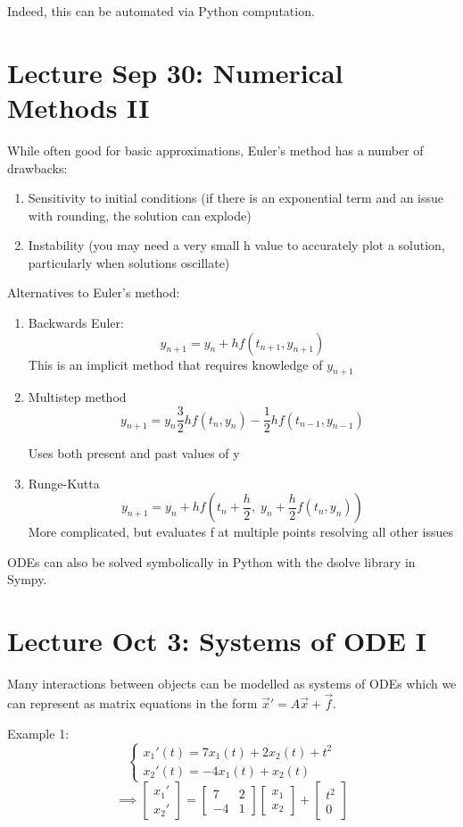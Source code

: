\documentclass[12pt]{article}
\begin{document}
Indeed, this can be automated via Python computation. 

\section{Lecture Sep 30: Numerical Methods II}
While often good for basic approximations, Euler's method has a number of drawbacks:
\begin{enumerate}
    \item Sensitivity to initial conditions (if there is an exponential term and an issue with rounding, the solution can explode)
    \item Instability (you may need a very small h value to accurately plot a solution, particularly when solutions oscillate)
\end{enumerate}

Alternatives to Euler's method: 
\begin{enumerate}
    \item Backwards Euler:
    \[y_{n+1} = y_n + hf(t_{n + 1}, y_{n + 1})\]
    This is an implicit method that requires knowledge of $y_{n + 1}$

    \item Multistep method 
    \[y_{n+1} = y_n \frac{3}{2}hf(t_n, y_n) - \frac{1}{2}hf(t_{n - 1}, y_{n -1})\] 

    Uses both present and past values of y

    \item Runge-Kutta 
    \[y_{n+ 1} = y_n + hf(t_n + \frac{h}{2}, \; y_n + \frac{h}{2} f(t_n, y_n))\]
    More complicated, but evaluates f at multiple points resolving all other issues
\end{enumerate}

ODEs can also be solved symbolically in Python with the dsolve library in Sympy.

\section{Lecture Oct 3: Systems of ODE I}
Many interactions between objects can be modelled as systems of ODEs which we can represent as matrix equations in the form $\vec{x}' = A\vec{x} + \vec{f}$.

Example 1: 
\[\begin{cases}
    x_1'(t) = 7x_1(t) + 2x_2(t) + t^2\\
    x_2'(t) = -4x_1(t) + x_2(t)
\end{cases}\]
\[\implies \begin{bmatrix}
    x_1'\\
    x_2'
\end{bmatrix} = \begin{bmatrix}
    7 & 2\\
    -4 & 1
\end{bmatrix} \begin{bmatrix}
    x_1\\
    x_2
\end{bmatrix} + \begin{bmatrix}
    t^2\\
    0
\end{bmatrix}\]
\end{document}
